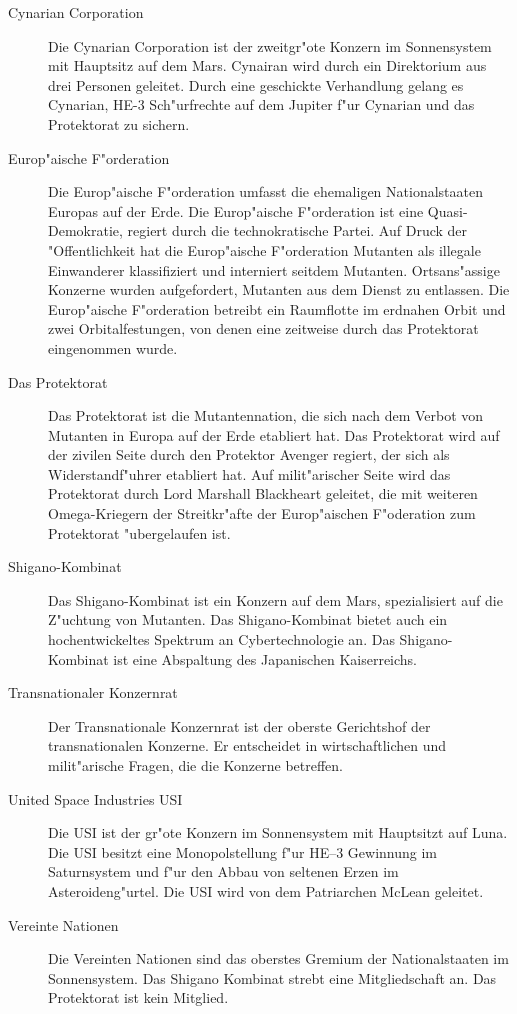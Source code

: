 \begin{description}
\item [Cynarian Corporation] Die Cynarian Corporation ist der zweitgr"o\3te Konzern im Sonnensystem mit Hauptsitz auf
      dem Mars. Cynairan wird durch ein Direktorium aus drei Personen geleitet. Durch eine geschickte Verhandlung gelang es Cynarian, HE-3 Sch"urfrechte auf dem Jupiter f"ur Cynarian und das Protektorat zu sichern.
      \item [Europ"aische F"orderation] Die Europ"aische F"orderation umfasst die ehemaligen Nationalstaaten Europas auf der Erde. Die Europ"aische F"orderation ist eine Quasi-Demokratie, regiert durch die technokratische Partei. Auf Druck der "Offentlichkeit hat die Europ"aische F"orderation Mutanten als illegale Einwanderer klassifiziert und interniert seitdem Mutanten. Ortsans"assige Konzerne wurden aufgefordert, Mutanten aus dem Dienst zu entlassen. Die Europ"aische F"orderation betreibt ein Raumflotte im erdnahen Orbit und zwei Orbitalfestungen, von denen eine zeitweise durch das Protektorat eingenommen wurde.
\item [Das Protektorat] Das Protektorat ist die Mutantennation, die sich nach dem Verbot von Mutanten in Europa
      auf der Erde etabliert hat. Das Protektorat wird auf der zivilen Seite durch den Protektor Avenger regiert, der sich als Widerstandf"uhrer etabliert hat. Auf milit"arischer Seite wird das Protektorat durch Lord Marshall Blackheart geleitet, die mit weiteren Omega-Kriegern der Streitkr"afte der Europ"aischen F"oderation zum Protektorat "ubergelaufen ist.
\item [Shigano-Kombinat] Das Shigano-Kombinat ist ein Konzern auf dem Mars, spezialisiert auf die Z"uchtung von
      Mutanten. Das Shigano-Kombinat bietet auch ein hochentwickeltes Spektrum an Cybertechnologie an. Das Shigano-Kombinat ist eine Abspaltung des Japanischen Kaiserreichs.
\item [Transnationaler Konzernrat] Der Transnationale Konzernrat ist der oberste Gerichtshof der transnationalen
      Konzerne. Er entscheidet in wirtschaftlichen und milit"arische Fragen, die die Konzerne betreffen.
\item [United Space Industries USI] Die USI ist der gr"o\3te Konzern im Sonnensystem mit Hauptsitzt auf Luna. Die USI
      besitzt eine Monopolstellung f"ur HE--3 Gewinnung im Saturnsystem und f"ur den Abbau von seltenen Erzen im Asteroideng"urtel. Die USI wird von dem Patriarchen McLean geleitet.
\item [Vereinte Nationen] Die Vereinten Nationen sind das oberstes Gremium der Nationalstaaten im Sonnensystem. Das
      Shigano Kombinat strebt eine Mitgliedschaft an. Das Protektorat ist kein Mitglied.
\end{description}

